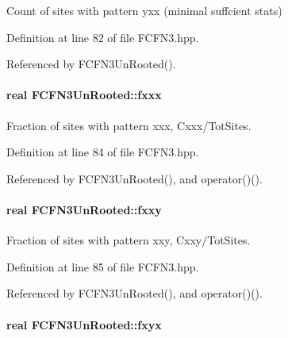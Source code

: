 \-Count of sites with pattern yxx (minimal suffcient stats) 



\-Definition at line 82 of file \-F\-C\-F\-N3.\-hpp.



\-Referenced by \-F\-C\-F\-N3\-Un\-Rooted().

\hypertarget{classFCFN3UnRooted_aa1b615a046f2277b3df566a3bc7bd1f0}{
\paragraph[{fxxx}]{\setlength{\rightskip}{0pt plus 5cm}real {\bf \-F\-C\-F\-N3\-Un\-Rooted\-::fxxx}}}\label{classFCFN3UnRooted_aa1b615a046f2277b3df566a3bc7bd1f0}


\-Fraction of sites with pattern xxx, \-Cxxx/\-Tot\-Sites. 



\-Definition at line 84 of file \-F\-C\-F\-N3.\-hpp.



\-Referenced by \-F\-C\-F\-N3\-Un\-Rooted(), and operator()().

\hypertarget{classFCFN3UnRooted_ad171363b9f0e86aab5c0116fb4b6c838}{
\paragraph[{fxxy}]{\setlength{\rightskip}{0pt plus 5cm}real {\bf \-F\-C\-F\-N3\-Un\-Rooted\-::fxxy}}}\label{classFCFN3UnRooted_ad171363b9f0e86aab5c0116fb4b6c838}


\-Fraction of sites with pattern xxy, \-Cxxy/\-Tot\-Sites. 



\-Definition at line 85 of file \-F\-C\-F\-N3.\-hpp.



\-Referenced by \-F\-C\-F\-N3\-Un\-Rooted(), and operator()().

\hypertarget{classFCFN3UnRooted_ac0c6bbacb2839de940a5e1b4989444ec}{
\paragraph[{fxyx}]{\setlength{\rightskip}{0pt plus 5cm}real {\bf \-F\-C\-F\-N3\-Un\-Rooted\-::fxyx}}}\label{classFCFN3UnRooted_ac0c6bbacb2839de940a5e1b4989444ec}


